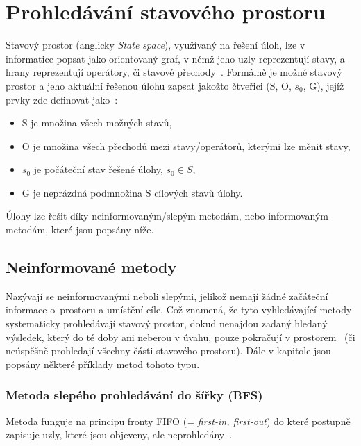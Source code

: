 \section{Prohledávání stavového prostoru}
Stavový prostor (anglicky \textit{State space}), využívaný na řešení úloh, lze v informatice popsat jako orientovaný graf, v němž jeho uzly reprezentují stavy, a hrany reprezentují operátory, či stavové přechody~\cite{State-Space_Search}. Formálně je možné stavový prostor a jeho aktuální řešenou úlohu zapsat jakožto čtveřici (S, O, $s_0$, G), jejíž prvky zde definovat jako~\cite{izu}:
\begin{itemize}
    \item S je množina všech možných stavů,
    \item O je množina všech přechodů mezi stavy/operátorů, kterými lze měnit stavy,
    \item $s_0$ je počáteční stav řešené úlohy, $s_0 \in S$,
    \item G je neprázdná podmnožina S cílových stavů úlohy.
\end{itemize}
Úlohy lze řešit díky neinformovaným/slepým metodám, nebo informovaným metodám, které jsou popsány níže. 

\subsection*{Neinformované metody}
Nazývají se neinformovanými neboli slepými, jelikož nemají žádné začáteční informace o~prostoru a umístění cíle. Což znamená, že tyto vyhledávající metody systematicky prohledávají stavový prostor, dokud nenajdou zadaný hledaný výsledek, který do té doby ani neberou v úvahu, pouze pokračují v  prostorem~\cite{poole2023artificial} (či neúspěšně prohledají všechny části stavového prostoru). Dále v kapitole jsou popsány některé příklady metod tohoto typu.

\subsubsection*{\textbullet Metoda slepého prohledávání do šířky (BFS)}
Metoda funguje na principu fronty FIFO (\textit{= first-in, first-out}) do které postupně zapisuje uzly, které jsou objeveny, ale neprohledány~\cite{poole2023artificial}. 


